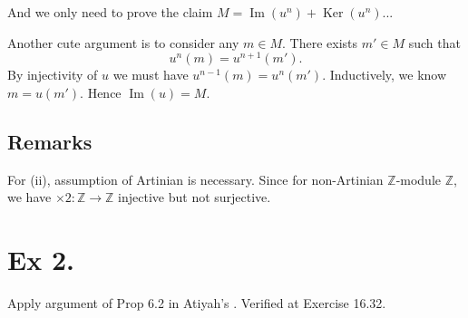 And we only need to prove the claim $M=\operatorname{Im}(u^n)+\operatorname{Ker}(u^n)$... 

Another cute argument is to consider any $m\in M$. There exists $m'\in M$ such that 
$$u^n(m)=u^{n+1}(m').$$
By injectivity of $u$ we must have $u^{n-1}(m)=u^n(m')$. Inductively, we know $m=u(m')$. Hence $\operatorname{Im}(u)=M$.

\subsection{Remarks}
For (ii), assumption of Artinian is necessary. Since for non-Artinian $\mathbb Z$-module $\mathbb Z$, we have $\times 2:\mathbb Z\to \mathbb Z$ injective but not surjective.

\section{Ex 2.}

Apply argument of Prop 6.2 in Atiyah's \cite{atiyah1994introduction}.
Verified at \cite{altman} Exercise 16.32. 